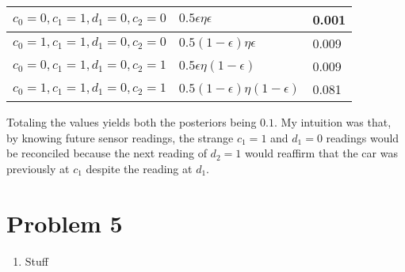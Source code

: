 \documentclass[12pt]{article}
\begin{document}
\begin{enumerate}[label=(\alph*)]
		\begin{tabular}{| l | l | l |}
			\hline
			\(c_0 = 0, c_1 = 1, d_1 = 0, c_2 = 0\) &
				\(0.5 \epsilon \eta \epsilon\) & 0.001\\ \hline
			\(c_0 = 1, c_1 = 1, d_1 = 0, c_2 = 0\) &
			   \(0.5 (1-\epsilon) \eta \epsilon\) & 0.009\\ \hline
			\(c_0 = 0, c_1 = 1, d_1 = 0, c_2 = 1\) &
			   \(0.5 \epsilon \eta (1-\epsilon)\) & 0.009\\ \hline
			\(c_0 = 1, c_1 = 1, d_1 = 0, c_2 = 1\) &
			   \(0.5 (1-\epsilon) \eta (1-\epsilon)\) & 0.081\\ \hline
		\end{tabular}

		Totaling the values yields both the posteriors being \(0.1\).
		My intuition was that, by knowing future sensor readings, the
		strange \(c_1 = 1\) and \(d_1 = 0\) readings would be reconciled
		because the next reading of \(d_2 = 1\) would reaffirm that
		the car was previously at \(c_1\) despite the reading at \(d_1\).

\end{enumerate}

\section*{Problem 5}

\begin{enumerate}[label=(\alph*)]
	\item Stuff
\end{enumerate}
\end{document}
